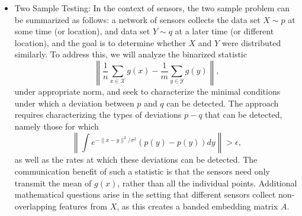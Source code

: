 \documentclass{article}
\newcommand{\comment}[3]{{\color{#1} {\bf #2 :} #3}}
\newcommand{\yoav}[1]{\comment{magenta}{Yoav}{#1}}
\newcommand{\rayan}[1]{\comment{red}{Rayan}{#1}}
\begin{document}
\begin{itemize}
\item Two Sample Testing: 
In the context of sensors, the two sample problem can be summarized as follows: a network of sensors collects the data set $X\sim p$ at some time (or location), and data set $Y\sim q$ at a later time (or different location), and the goal is to determine whether $X$ and $Y$ were distributed similarly.  To address this, we will analyze the binarized statistic $$\left\|\frac{1}{n}\sum_{x\in \mathcal{X}} g(x) - \frac{1}{m}\sum_{y\in \mathcal{Y}} g(y)\right\|,$$
under appropriate norm, and seek to characterize the minimal conditions under which a deviation between $p$ and $q$ can be detected.   The approach requires characterizing the types of deviations $p - q$ that can be detected, namely those for which $$\left\|\int e^{-\|x-y\|^2/\sigma^2} (p(y) - p(y)) dy \right\| > \epsilon,$$ as well as the rates at which these deviations can be detected.
The communication benefit of such a statistic is that the sensors need
only transmit the mean of $g(x)$, rather than all the individual
points.  Additional mathematical questions arise in the setting that
different sensors collect non-overlapping features from $X$, as this
creates a banded embedding matrix $A$.


\end{itemize}
\end{document}
